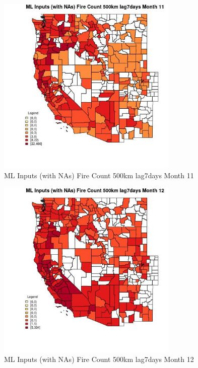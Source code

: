 \begin{figure} 
\centering  
\includegraphics[width=0.77\textwidth]{Code_Outputs/Report_ML_input_PM25_Step4_part_e_de_duplicated_aves_compiled_2019-05-21wNAs_CountyFire_Count_500km_lag7daysmedianMonth11.jpg} 
\caption{\label{fig:Report_ML_input_PM25_Step4_part_e_de_duplicated_aves_compiled_2019-05-21wNAsCountyFire_Count_500km_lag7daysmedianMonth11}ML Inputs (with NAs) Fire Count 500km lag7days Month 11} 
\end{figure} 
 

\begin{figure} 
\centering  
\includegraphics[width=0.77\textwidth]{Code_Outputs/Report_ML_input_PM25_Step4_part_e_de_duplicated_aves_compiled_2019-05-21wNAs_CountyFire_Count_500km_lag7daysmedianMonth12.jpg} 
\caption{\label{fig:Report_ML_input_PM25_Step4_part_e_de_duplicated_aves_compiled_2019-05-21wNAsCountyFire_Count_500km_lag7daysmedianMonth12}ML Inputs (with NAs) Fire Count 500km lag7days Month 12} 
\end{figure} 
 

